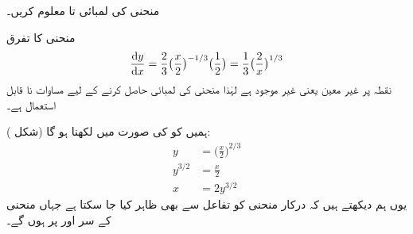 منحنی  کی لمبائی  تا  معلوم کریں۔

منحنی کا تفرق
\begin{align*}
\frac{\dif y}{\dif x}=\frac{2}{3}\big(\frac{x}{2}\big)^{-1/3}\big(\frac{1}{2}\big)=\frac{1}{3}\big(\frac{2}{x}\big)^{1/3}
\end{align*}
نقطہ  پر غیر معین یعنی غیر موجود ہے لہٰذا منحنی کی لمبائی حاصل کرنے کے لیے  مساوات  نا قابل استعمال ہے۔

ہمیں  کو  کی صورت میں لکھنا ہو گا (شکل ):
\begin{align*}
y&=\big(\frac{x}{2}\big)^{2/3}\\
y^{3/2}&=\frac{x}{2}\\
x&=2y^{3/2}
\end{align*}
یوں ہم دیکھتے ہیں کہ درکار منحنی کو تفاعل  سے بھی ظاہر کیا جا سکتا ہے جہاں منحنی کے سر  اور  پر ہوں گے۔


